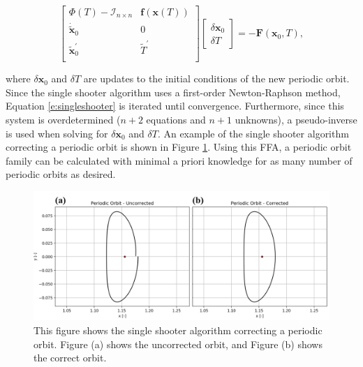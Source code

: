 \documentclass[11pt]{article} %
\begin{document}
\doublespace
\begin{equation}
	\label{e:singleshooter}
	\begin{bmatrix}
	\Phi\left(T\right) - \mathcal{I}_{n\times n} & \bm{f}\left(\bm{x}\left(T\right)\right) \\
	\dot{\tilde{\bm{x}}}_0 & 0 \\
	\tilde{\bm{x}}_0^{\prime} & \tilde{T}^{\prime} \\
	\end{bmatrix} \begin{bmatrix}
	\delta\bm{x}_0 \\
	\delta T
	\end{bmatrix} = -\bm{F}\left(\bm{x}_0, T\right),
\end{equation}
\singlespace

\noindent
where $\delta\bm{x}_0$ and $\delta T$ are updates to the initial conditions of the new periodic orbit. Since the single shooter algorithm uses a first-order Newton-Raphson method, Equation \ref{e:singleshooter} is iterated until convergence. Furthermore, since this system is overdetermined ($n+2$ equations and $n+1$ unknowns), a pseudo-inverse is used when solving for $\delta\bm{x}_0$ and $\delta T$. An example of the single shooter algorithm correcting a periodic orbit is shown in Figure \ref{f:singleshooter}. Using this FFA, a periodic orbit family can be calculated with minimal a priori knowledge for as many number of periodic orbits as desired. 

\begin{figure}[H]
    \centering
    \includegraphics[width=6in]{po_corrected.png}
    \caption{This figure shows the single shooter algorithm correcting a periodic orbit. Figure (a) shows the uncorrected orbit, and Figure (b) shows the correct orbit.}
    \label{f:singleshooter}
\end{figure}
\end{document}
